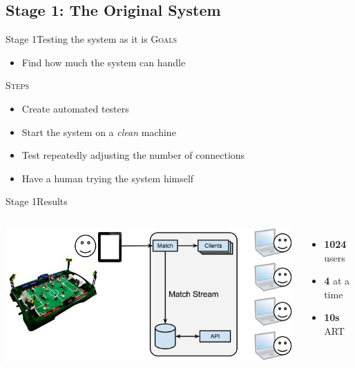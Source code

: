 \documentclass[utf8]{beamer}
\begin{document}
\subsection{Stage 1: The Original System}
\begin{frame}{Stage 1}{Testing the system as it is}
	\textsc{Goals}
	\begin{itemize}
		\item Find how much the system can handle
	\end{itemize}
	\pause
	\textsc{Steps}
	\begin{itemize}
		\item Create automated testers
		\item Start the system on a \emph{clean} machine
		\item Test repeatedly adjusting the number of connections
		\item Have a human trying the system himself
	\end{itemize}
\end{frame}
\begin{frame}{Stage 1}{Results}
	\begin{columns}
			\includegraphics[top=-1,width=\textwidth]{img/results-1.png}
			\begin{itemize}
				\item \textbf{\Large 1024} users
				\item \textbf{\Large 4} at a time
				\item \textbf{\Large 10s} ART
			\end{itemize}
	\end{columns}
\end{frame}
\end{document}
